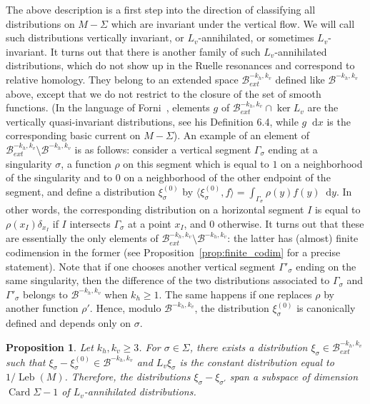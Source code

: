 \documentclass[11pt, a4paper, oneside, final, pagebackref]{amsart}
\newcommand{\boB}{\mathcal{B}}
\newcommand{\dd}{\mathop{}\!\mathrm{d}}
\DeclareMathOperator{\Card}{Card}
\DeclareMathOperator{\Leb}{Leb}
\renewcommand{\geq}{\geqslant}
\newtheorem{prop}[thm]{Proposition}
\theoremstyle{definition}
\numberwithin{equation}{section}
\begin{document}
The above description is a first step into the direction of classifying all
distributions on $M-\Sigma$ which are invariant under the vertical flow. We
will call such distributions vertically invariant, or $L_v$-annihilated, or
sometimes $L_v$-invariant. It turns out that there is another family of such
$L_v$-annihilated distributions, which do not show up in the Ruelle
resonances and correspond to relative homology. They belong to an extended
space $\boB^{-k_h, k_v}_{ext}$ defined like $\boB^{-k_h, k_v}$ above, except
that we do not restrict to the closure of the set of smooth functions. (In
the language of Forni~\cite{forni_deviation}, elements $g$ of
$\boB_{ext}^{-k_h, k_v} \cap \ker L_v$ are the vertically quasi-invariant
distributions, see his Definition 6.4, while $g\dd x$ is the corresponding
basic current on $M-\Sigma$). \label{page_B_ext_not_B} An example of an element of $\boB_{ext}^{-k_h,
k_v}\setminus \boB^{-k_h, k_v}$ is as follows: consider a vertical segment
$\Gamma_\sigma$ ending at a singularity $\sigma$, a function $\rho$ on this
segment which is equal to $1$ on a neighborhood of the singularity and to $0$
on a neighborhood of the other endpoint of the segment, and define a
distribution $\xi_\sigma^{(0)}$ by $\langle \xi_\sigma^{(0)}, f\rangle =
\int_{\Gamma_\sigma} \rho(y) f(y)\dd y$. In other words, the corresponding
distribution on a horizontal segment $I$ is equal to $\rho(x_I) \delta_{x_I}$
if $I$ intersects $\Gamma_\sigma$ at a point $x_I$, and $0$ otherwise. It
turns out that these are essentially the only elements of $\boB_{ext}^{-k_h,
k_v}\setminus \boB^{-k_h, k_v}$: the latter has (almost) finite codimension
in the former (see Proposition~\ref{prop:finite_codim} for a precise
statement). Note that if one chooses another vertical segment
$\Gamma'_\sigma$ ending on the same singularity, then the difference of the
two distributions associated to $\Gamma_\sigma$ and $\Gamma'_\sigma$ belongs
to $\boB^{-k_h, k_v}$ when $k_h \geq 1$. The same happens if one replaces
$\rho$ by another function $\rho'$. Hence, modulo $\boB^{-k_h, k_v}$, the
distribution $\xi_\sigma^{(0)}$ is canonically defined and depends only on
$\sigma$.

\begin{prop}
\label{prop:spurious_distributions} Let $k_h, k_v\geq 3$. For $\sigma \in
\Sigma$, there exists a distribution $\xi_\sigma \in \boB_{ext}^{-k_h, k_v}$
such that $\xi_\sigma - \xi_\sigma^{(0)} \in \boB^{-k_h, k_v}$ and $L_v
\xi_\sigma$ is the constant distribution equal to $1/\Leb(M)$. Therefore, the
distributions $\xi_\sigma- \xi_{\sigma'}$ span a subspace of dimension $\Card
\Sigma- 1$ of $L_v$-annihilated distributions.
\end{prop}
\end{document}
